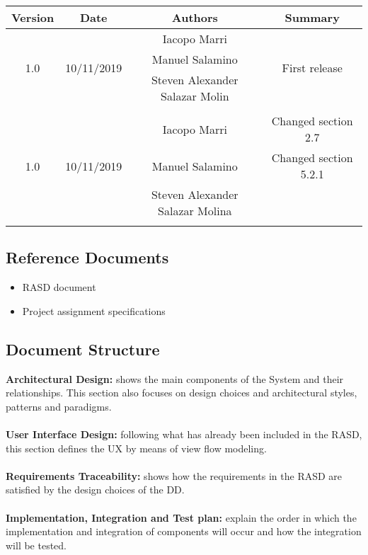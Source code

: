 \begin{center}
\begin{tabular}{ |c|c|c|c| } 
\hline
 Version & Date & Authors & Summary \\ 
\hline
\multirow{3}{*}{1.0} & \multirow{3}{*}{10/11/2019} & Iacopo Marri & \multirow{3}{*}{First release} \\ 
&  & Manuel Salamino & \\ 
&  & Steven Alexander Salazar Molin & \\ 
\hline
\multirow{5}{*}{1.0} & \multirow{5}{*}{10/11/2019} &  & \\ 
&  & Iacopo Marri  &  Changed section 2.7\\
&  & Manuel Salamino &  Changed section 5.2.1 \\ 
&  & Steven Alexander Salazar Molina &\\ 
&  & & \\
\hline
\end{tabular}
\end{center}

\subsection{Reference Documents}
    \begin{itemize}
        \item RASD document
        \item Project assignment specifications
    \end{itemize}

\subsection{Document
Structure}

\textbf{Architectural Design:} shows the main components of the System and their relationships. This section also focuses on design choices and architectural styles, patterns and paradigms.\\\\
\textbf{User Interface Design:} following what has already been included in the RASD, this section defines the UX by means of view flow modeling.\\\\
\textbf{Requirements Traceability:} shows how the requirements in the RASD are satisfied by the design choices of the DD.\\\\
\textbf{Implementation, Integration and Test plan:} explain the order in which the implementation and integration of components will occur and how the integration will be tested.\\